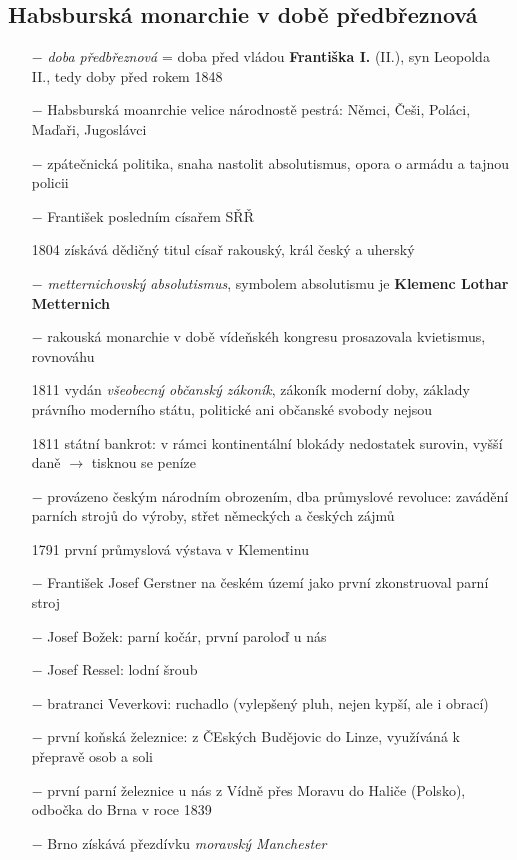 \documentclass{article}
\begin{document}
\subsection*{Habsburská monarchie v době předbřeznová}
\begin{itemize}
    \vspace{-0.5em}
    \setlength\itemsep{0.15em}
    \item[$-$] \textit{doba předbřeznová} = doba před vládou \textbf{Františka I.} (II.), syn Leopolda II., tedy doby před rokem 1848
    \item[$-$] Habsburská moanrchie velice národnostě pestrá: Němci, Češi, Poláci, Maďaři, Jugoslávci
    \item[$-$] zpátečnická politika, snaha nastolit absolutismus, opora o armádu a tajnou policii
    \item[$-$] František posledním císařem SŘŘ
    \item[1804] získává dědičný titul císař rakouský, král český a uherský
    \item[$-$] \textit{metternichovský absolutismus}, symbolem absolutismu je \textbf{Klemenc Lothar Metternich}
    \item[$-$] rakouská monarchie v době vídeňskéh kongresu prosazovala kvietismus, rovnováhu
    \item[1811] vydán \textit{všeobecný občanský zákoník}, zákoník moderní doby, základy právního moderního státu, politické ani občanské svobody nejsou
    \item[1811] státní bankrot: v rámci kontinentální blokády nedostatek surovin, vyšší daně $\rightarrow$ tisknou se peníze
    \item[$-$] provázeno českým národním obrozením, dba průmyslové revoluce: zavádění parních strojů do výroby, střet německých a českých zájmů
    \item[1791] první průmyslová výstava v Klementinu
    \item[$-$] František Josef Gerstner na českém území jako první zkonstruoval parní stroj
    \item[$-$] Josef Božek: parní kočár, první paroloď u nás
    \item[$-$] Josef Ressel: lodní šroub
    \item[$-$] bratranci Veverkovi: ruchadlo (vylepšený pluh, nejen kypší, ale i obrací)
    \item[$-$] první koňská železnice: z ČEských Budějovic do Linze, využíváná k přepravě osob a soli
    \item[$-$] první parní železnice u nás z Vídně přes Moravu do Haliče (Polsko), odbočka do Brna v roce 1839
    \item[$-$] Brno získává přezdívku \textit{moravský Manchester}
\end{itemize}
\end{document}
